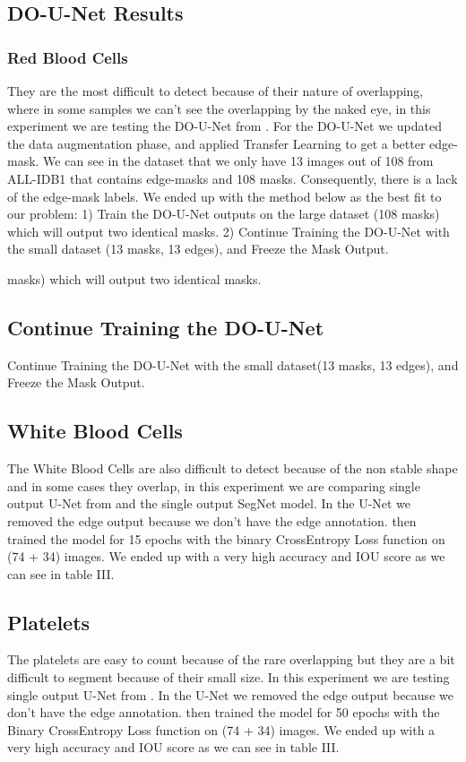 \documentclass[conference]{IEEEtran}
\begin{document}
\subsection{DO-U-Net Results}
\subsubsection{Red Blood Cells}
They are the most difficult to detect because of their nature of overlapping, where in some samples we can’t see the overlapping by the naked eye, in this experiment we are testing the DO-U-Net from \cite{12}. For the DO-U-Net we updated the data augmentation phase, and applied Transfer Learning to get a better edge-mask. We can see in the dataset that we only have 13 images out of 108 from ALL-IDB1 that contains edge-masks and 108 masks. Consequently, there is a lack of the edge-mask labels. We ended up with the method below as the best fit to our problem:
1) Train the DO-U-Net outputs on the large dataset (108 masks) which will output two identical masks.
2) Continue Training the DO-U-Net with the small dataset (13 masks, 13 edges), and Freeze the Mask Output.

masks) which will output two identical masks.
\subsection{Continue Training the DO-U-Net}
Continue Training the DO-U-Net with the small dataset(13 masks, 13 edges), and Freeze the Mask Output.
\subsection{White Blood Cells}
The White Blood Cells are also difficult to detect because of the non stable shape and in some cases they overlap, in this experiment we are comparing single output U-Net from \cite{12} and the single output SegNet model. In the U-Net we removed the edge output because we don’t have the edge annotation. then trained the model for 15 epochs with the binary CrossEntropy Loss function on (74 + 34) images. We ended up with a very high accuracy and IOU score as we can see in table III.
\subsection{Platelets}
The platelets are easy to count because of the rare overlapping but they are a bit difficult to segment because of their small size. In this experiment we are testing single output U-Net from \cite{12}. In the U-Net we removed the edge output because we don’t have the edge annotation. then trained the model for 50 epochs with the Binary CrossEntropy Loss function on (74 + 34) images. We ended up with a very high accuracy and IOU score as we can see in table III.
\end{document}
